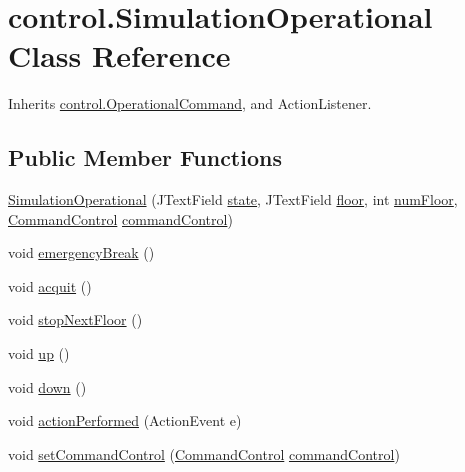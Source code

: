 \hypertarget{classcontrol_1_1_simulation_operational}{}\section{control.\+Simulation\+Operational Class Reference}
\label{classcontrol_1_1_simulation_operational}


Inherits \mbox{\hyperlink{interfacecontrol_1_1_operational_command}{control.\+Operational\+Command}}, and Action\+Listener.

\subsection*{Public Member Functions}
\begin{DoxyCompactItemize}
\item 
\mbox{\hyperlink{classcontrol_1_1_simulation_operational_a05ea4626f887de31e4c40b3ff2e52162}{Simulation\+Operational}} (J\+Text\+Field \mbox{\hyperlink{classcontrol_1_1_simulation_operational_a0bc5bcb8d7007bfcca3cf0e204dfce5f}{state}}, J\+Text\+Field \mbox{\hyperlink{classcontrol_1_1_simulation_operational_ad41ae86e7cedc53680f57db31321c34f}{floor}}, int \mbox{\hyperlink{classcontrol_1_1_simulation_operational_a8b244e8cd89afb3060e4025c76f3ccc1}{num\+Floor}}, \mbox{\hyperlink{interfacecontrol_1_1_command_control}{Command\+Control}} \mbox{\hyperlink{classcontrol_1_1_simulation_operational_a381628f543ab9b586023f718af9a279d}{command\+Control}})
\item 
void \mbox{\hyperlink{classcontrol_1_1_simulation_operational_a1d385c1f369eb3aff538c36b5947f8ed}{emergency\+Break}} ()
\item 
void \mbox{\hyperlink{classcontrol_1_1_simulation_operational_a66881a9f2cf8526dee93b756f8ad47af}{acquit}} ()
\item 
void \mbox{\hyperlink{classcontrol_1_1_simulation_operational_a2ca8414424f8becf5c5942b9dbba80aa}{stop\+Next\+Floor}} ()
\item 
void \mbox{\hyperlink{classcontrol_1_1_simulation_operational_ab3ade4511703ee9715f82ce6e9a036a0}{up}} ()
\item 
void \mbox{\hyperlink{classcontrol_1_1_simulation_operational_a67c7dc0ec1b837a8174d127cb6803eb9}{down}} ()
\item 
void \mbox{\hyperlink{classcontrol_1_1_simulation_operational_a9cce36fe391bc34c0b5bdbbef9244f05}{action\+Performed}} (Action\+Event e)
\item 
void \mbox{\hyperlink{classcontrol_1_1_simulation_operational_a66fd6c0df3888639296a867c106590e3}{set\+Command\+Control}} (\mbox{\hyperlink{interfacecontrol_1_1_command_control}{Command\+Control}} \mbox{\hyperlink{classcontrol_1_1_simulation_operational_a381628f543ab9b586023f718af9a279d}{command\+Control}})
\end{DoxyCompactItemize}
